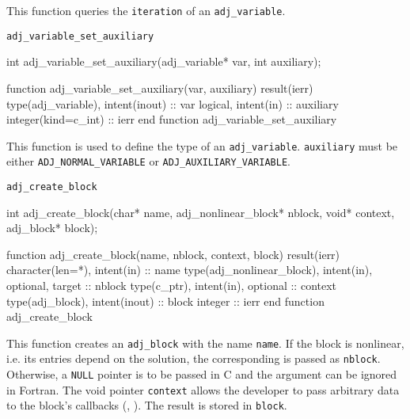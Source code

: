 This function queries the \texttt{iteration} of an \texttt{adj_variable}.


\begin{boxwithtitle}{\texttt{adj_variable_set_auxiliary}}
\begin{minipage}{\columnwidth}
\begin{ccode}
  int adj_variable_set_auxiliary(adj_variable* var, int auxiliary);
\end{ccode}
\begin{fortrancode}
  function adj_variable_set_auxiliary(var, auxiliary) result(ierr)
    type(adj_variable), intent(inout) :: var
    logical, intent(in) :: auxiliary
    integer(kind=c_int) :: ierr
  end function adj_variable_set_auxiliary
\end{fortrancode}
\end{minipage}
\end{boxwithtitle}

This function is used to define the type of an \texttt{adj_variable}.
\texttt{auxiliary} must be either \texttt{ADJ_NORMAL_VARIABLE}  or \texttt{ADJ_AUXILIARY_VARIABLE}.


\begin{boxwithtitle}{\texttt{adj_create_block}}
\begin{minipage}{\columnwidth}
\begin{ccode}
  int adj_create_block(char* name, adj_nonlinear_block* nblock, void* context, 
                       adj_block* block);
\end{ccode}
\begin{fortrancode}
  function adj_create_block(name, nblock, context, block) result(ierr)
    character(len=*), intent(in) :: name
    type(adj_nonlinear_block), intent(in), optional, target :: nblock
    type(c_ptr), intent(in), optional :: context
    type(adj_block), intent(inout) :: block
    integer :: ierr
  end function adj_create_block
\end{fortrancode}
\end{minipage}
\end{boxwithtitle}

This function creates an \texttt{adj_block} with the name \texttt{name}.
If the block is nonlinear, i.e. its entries depend on the solution, the corresponding  is passed as \texttt{nblock}. 
Otherwise, a \texttt{NULL} pointer is to be passed in C and the argument can be ignored in Fortran.
The void pointer \texttt{context} allows the developer to pass arbitrary data to the block's callbacks (, ). 
The result is stored in \texttt{block}. 

